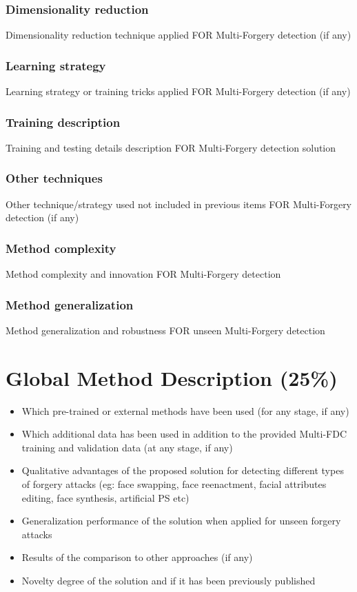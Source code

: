 \documentclass{article}
\begin{document}
\subsubsection{Dimensionality reduction}
Dimensionality reduction technique applied FOR Multi-Forgery detection  (if any)

\subsubsection{Learning strategy}
Learning strategy or training tricks applied FOR Multi-Forgery detection (if any)

\subsubsection{Training description}
Training and testing details description FOR Multi-Forgery detection solution

\subsubsection{Other techniques}
Other technique/strategy used not included in previous items FOR Multi-Forgery detection (if any)

\subsubsection{Method complexity}
Method complexity and innovation FOR Multi-Forgery detection

\subsubsection{Method generalization}
Method generalization and robustness FOR unseen Multi-Forgery detection




\section{Global Method Description (25\%)}

\begin{itemize}
\item Which pre-trained or external methods have been used (for any stage, if any)
\item Which additional data has been used in addition to the provided Multi-FDC training and validation data (at any stage, if any)
\item Qualitative advantages of the proposed solution for detecting different types of forgery attacks (eg: face swapping, face reenactment, facial attributes editing, face synthesis, artificial PS etc)
\item Generalization performance of the solution when applied for unseen forgery attacks
\item Results of the comparison to other approaches (if any)
\item Novelty degree of the solution and if it has been previously published
\end{itemize}
\end{document}
